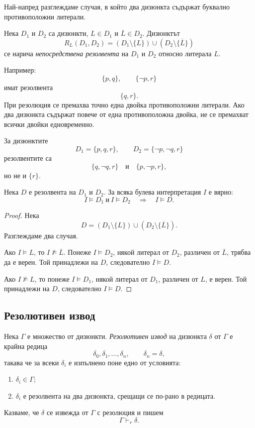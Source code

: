 Най-напред разглеждаме случая, в който два дизюнкта съдържат буквално противоположни литерали.

\begin{defn}
Нека $D_1$ и $D_2$ са дизюнкти, $L\in D_1$ и $\overline L\in D_2$. Дизюнктът
\[
R_L(D_1,D_2)
=
(D_1\setminus\{L\})\cup(D_2\setminus\{\overline L\})
\]
се нарича \emph{непосредствена резолвента} на $D_1$ и $D_2$ относно литерала $L$.
\end{defn}

Например:
\[
\{p,q\},\qquad \{\neg p,r\}
\]
имат резолвента
\[
\{q,r\}.
\]
При резолюция се премахва точно една двойка противоположни литерали. Ако два дизюнкта съдържат повече от една противоположна двойка, не се премахват всички двойки едновременно.

\begin{example}
За дизюнктите
\[
D_1=\{p,q,r\},
\qquad
D_2=\{\neg p,\neg q,r\}
\]
резолвентите са
\[
\{q,\neg q,r\}
\quad\text{и}\quad
\{p,\neg p,r\},
\]
но не и $\{r\}$.
\end{example}

\begin{lem}
Нека $D$ е резолвента на $D_1$ и $D_2$. За всяка булева интерпретация $I$ е вярно:
\[
I\models D_1\ \text{и}\ I\models D_2
\quad\Longrightarrow\quad
I\models D.
\]
\end{lem}

\begin{proof}
Нека
\[
D=(D_1\setminus\{L\})\cup(D_2\setminus\{\overline L\}).
\]
Разглеждаме два случая.

Ако $I\models L$, то $I\not\models\overline L$. Понеже $I\models D_2$, някой литерал от $D_2$, различен от $\overline L$, трябва да е верен. Той принадлежи на $D$, следователно $I\models D$.

Ако $I\not\models L$, то понеже $I\models D_1$, някой литерал от $D_1$, различен от $L$, е верен. Той принадлежи на $D$, следователно $I\models D$.
\end{proof}

\subsection{Резолютивен извод}\label{s:22.2.2}

\begin{defn}
Нека $\Gamma$ е множество от дизюнкти. \emph{Резолютивен извод} на дизюнкта $\delta$ от $\Gamma$ е крайна редица
\[
\delta_0,\delta_1,\ldots,\delta_n,
\qquad \delta_n=\delta,
\]
такава че за всеки $\delta_i$ е изпълнено поне едно от условията:

\begin{enumerate}
\item $\delta_i\in\Gamma$;
\item $\delta_i$ е резолвента на два дизюнкта, срещащи се по-рано в редицата.
\end{enumerate}

Казваме, че $\delta$ се извежда от $\Gamma$ с резолюция и пишем
\[
\Gamma\vdash_r\delta.
\]
\end{defn}

